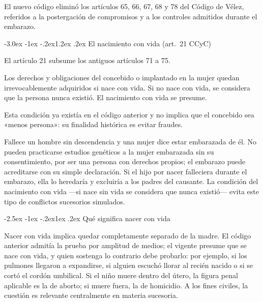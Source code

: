 \documentclass[12pt,oneside]{book}
\makeatletter
\renewcommand\section{\@startsection{section}{1}{\z@}%
  {-3.0ex \@plus -1ex \@minus -.2ex}{1.2ex \@plus .2ex}%
  {\normalfont\large\bfseries\color{acento}}}
\renewcommand\subsection{\@startsection{subsection}{2}{\z@}%
  {-2.5ex \@plus -1ex \@minus -.2ex}{1ex \@plus .2ex}%
  {\normalfont\normalsize\bfseries}}
\makeatother
\begin{document}
El nuevo código eliminó los artículos 65, 66, 67, 68 y 78 del Código de Vélez, referidos a la postergación de compromisos y a los controles admitidos durante el embarazo.

\section{El nacimiento con vida (art.~21 CCyC)}

El artículo 21 subsume los antiguos artículos 71 a 75.

\begin{regla}
Los derechos y obligaciones del concebido o implantado en la mujer quedan irrevocablemente adquiridos si nace con vida. Si no nace con vida, se considera que la persona nunca existió. El nacimiento con vida se presume.
\end{regla}

Esta condición ya existía en el código anterior y no implica que el concebido sea «menos persona»: su finalidad histórica es evitar fraudes.

\begin{ejemplo}
Fallece un hombre sin descendencia y una mujer dice estar embarazada de él. No pueden practicarse estudios genéticos a la mujer embarazada sin su consentimiento, por ser una persona con derechos propios; el embarazo puede acreditarse con su simple declaración. Si el hijo por nacer falleciera durante el embarazo, ella lo heredaría y excluiría a los padres del causante. La condición del nacimiento con vida ---si nace sin vida se considera que nunca existió--- evita este tipo de conflictos sucesorios simulados.
\end{ejemplo}

\subsection{Qué significa nacer con vida}

Nacer con vida implica quedar completamente separado de la madre. El código anterior admitía la prueba por amplitud de medios; el vigente presume que se nace con vida, y quien sostenga lo contrario debe probarlo: por ejemplo, si los pulmones llegaron a expandirse, si alguien escuchó llorar al recién nacido o si se cortó el cordón umbilical. Si el niño muere dentro del útero, la figura penal aplicable es la de aborto; si muere fuera, la de homicidio. A los fines civiles, la cuestión es relevante centralmente en materia sucesoria.
\end{document}
